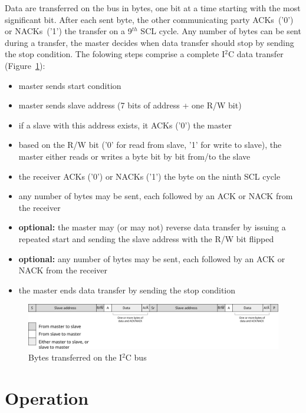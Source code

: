\documentclass[a4paper,11pt]{article}
\begin{document}
Data are transferred on the bus in bytes, one bit at a time starting with the most significant bit.
After each sent byte, the other communicating party ACKs~('0') or NACKs~('1') the transfer on a
9$^{th}$ SCL cycle. Any number of bytes can be sent during a transfer, the master decides when data
transfer should stop by sending the stop condition. The folowing steps comprise a complete I$^2$C
data transfer (Figure~\ref{fig:i2c-transf}):
\begin{itemize}
  \item master sends start condition
  \item master sends slave address (7 bits of address + one R/W bit)
  \item if a slave with this address exists, it ACKs ('0') the master
  \item based on the R/W bit ('0' for read from  slave, '1' for write to slave), the master either
  reads or writes a byte bit by bit from/to the slave
  \item the receiver ACKs ('0') or NACKs ('1') the byte on the ninth SCL cycle
  \item any number of bytes may be sent, each followed by an ACK or NACK from the receiver
  \item \textbf{optional:} the master may (or may not) reverse data transfer by issuing a repeated start and sending the
  slave address with the R/W bit flipped
  \item \textbf{optional:} any number of bytes may be sent, each followed by an ACK or NACK from the receiver
  \item the master ends data transfer by sending the stop condition
\end{itemize}

\begin{figure}
  \centerline{\includegraphics[width=\textwidth]{fig/i2c-transf}}
  \caption{Bytes transferred on the I$^2$C bus}
  \label{fig:i2c-transf}
\end{figure}

\pagebreak
\section{Operation}
\label{sec:oper}
\end{document}
